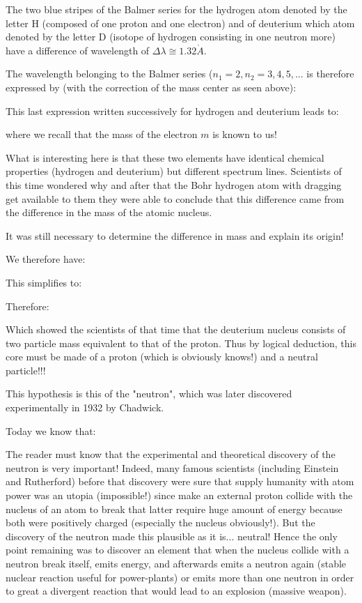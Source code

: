 The two blue stripes of the Balmer series for the hydrogen atom denoted by the letter $\mathrm{H}$ (composed of one proton and one electron) and of deuterium which atom denoted by the letter $\mathrm{D}$ (isotope of hydrogen consisting in one neutron more) have a difference of wavelength of $\Delta \lambda \cong 1.32 \mathring{A}$.

The wavelength belonging to the Balmer series ($n_1=2,n_2=3,4,5,...$ is therefore expressed by (with the correction of the mass center as seen above):
	
	This last expression written successively for hydrogen and deuterium leads to:
	
	where we recall that the mass of the electron $m$ is known to us! 
	
	What is interesting here is that these two elements have identical chemical properties (hydrogen and deuterium) but different spectrum lines. Scientists of this time wondered why and after that the Bohr hydrogen atom with dragging get available to them they were able to conclude that this difference came from the difference in the mass of the atomic nucleus.
	
	It was still necessary to determine the difference in mass and explain its origin!
	
	We therefore have:
	
	This simplifies to:
	
	Therefore:
	
	Which showed the scientists of that time that the deuterium nucleus consists of two particle mass equivalent to that of the proton. Thus by logical deduction, this core must be made of a proton (which is obviously knows!) and a neutral particle!!!
	
	This hypothesis is this of the "neutron", which was later discovered experimentally in 1932 by Chadwick.
	
	Today we know that:
	
	The reader must know that the experimental and theoretical discovery of the neutron is very important! Indeed, many famous scientists (including Einstein and Rutherford) before that discovery were sure that supply humanity with atom power was an utopia (impossible!) since make an external proton collide with the nucleus of an atom to break that latter require huge amount of energy because both were positively charged (especially the nucleus obviously!). But the discovery of the neutron made this plausible as it is... neutral! Hence the only point remaining was to discover an element that when the nucleus collide with a neutron break itself, emits energy, and afterwards emits a neutron again (stable nuclear reaction useful for power-plants) or emits more than one neutron in order to great a divergent reaction that would lead to an explosion (massive weapon).
	
